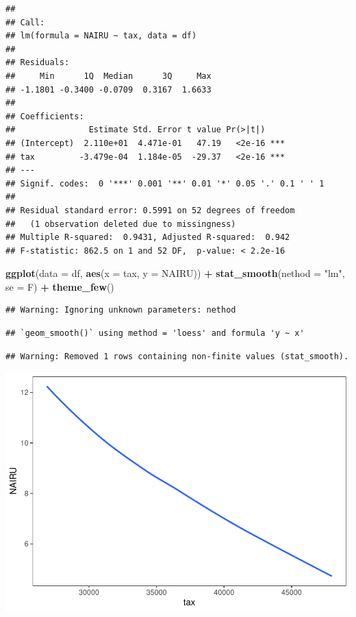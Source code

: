 \documentclass[
]{article}
\newenvironment{Shaded}{\begin{snugshade}}{\end{snugshade}}
\newcommand{\DataTypeTok}[1]{\textcolor[rgb]{0.13,0.29,0.53}{#1}}
\newcommand{\KeywordTok}[1]{\textcolor[rgb]{0.13,0.29,0.53}{\textbf{#1}}}
\newcommand{\NormalTok}[1]{#1}
\newcommand{\OperatorTok}[1]{\textcolor[rgb]{0.81,0.36,0.00}{\textbf{#1}}}
\newcommand{\StringTok}[1]{\textcolor[rgb]{0.31,0.60,0.02}{#1}}
\begin{document}
\begin{verbatim}
## 
## Call:
## lm(formula = NAIRU ~ tax, data = df)
## 
## Residuals:
##     Min      1Q  Median      3Q     Max 
## -1.1801 -0.3400 -0.0709  0.3167  1.6633 
## 
## Coefficients:
##               Estimate Std. Error t value Pr(>|t|)    
## (Intercept)  2.110e+01  4.471e-01   47.19   <2e-16 ***
## tax         -3.479e-04  1.184e-05  -29.37   <2e-16 ***
## ---
## Signif. codes:  0 '***' 0.001 '**' 0.01 '*' 0.05 '.' 0.1 ' ' 1
## 
## Residual standard error: 0.5991 on 52 degrees of freedom
##   (1 observation deleted due to missingness)
## Multiple R-squared:  0.9431, Adjusted R-squared:  0.942 
## F-statistic: 862.5 on 1 and 52 DF,  p-value: < 2.2e-16
\end{verbatim}

\begin{Shaded}
\begin{Highlighting}[]
\KeywordTok{ggplot}\NormalTok{(}\DataTypeTok{data =}\NormalTok{ df, }\KeywordTok{aes}\NormalTok{(}\DataTypeTok{x =}\NormalTok{ tax, }\DataTypeTok{y =}\NormalTok{ NAIRU)) }\OperatorTok{+}\StringTok{ }\KeywordTok{stat_smooth}\NormalTok{(}\DataTypeTok{nethod =} \StringTok{"lm"}\NormalTok{, }
    \DataTypeTok{se =}\NormalTok{ F) }\OperatorTok{+}\StringTok{ }\KeywordTok{theme_few}\NormalTok{()}
\end{Highlighting}
\end{Shaded}

\begin{verbatim}
## Warning: Ignoring unknown parameters: nethod
\end{verbatim}

\begin{verbatim}
## `geom_smooth()` using method = 'loess' and formula 'y ~ x'
\end{verbatim}

\begin{verbatim}
## Warning: Removed 1 rows containing non-finite values (stat_smooth).
\end{verbatim}

\begin{center}\includegraphics{Econo2_P5_files/figure-latex/loading data pme-2} \end{center}
\end{document}
